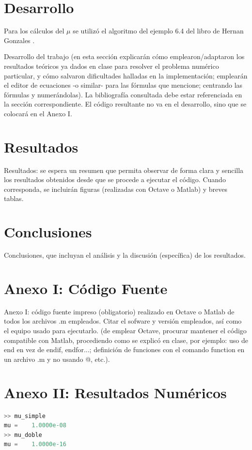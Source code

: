 \documentclass[11pt,a4paper]{article}
\begin{document}
\section{Desarrollo}
Para los cálculos del \(\mu\) se utilizó el algoritmo del ejemplo 6.4 del libro de Hernan Gonzales \cite{Gonzales}.
 
 Desarrollo del trabajo (en esta sección explicarán cómo emplearon/adaptaron los
resultados teóricos ya dados en clase para resolver el problema numérico particular, y cómo
salvaron dificultades halladas en la implementación; emplearán el editor de ecuaciones -o
similar- para las fórmulas que mencione; centrando las fórmulas y numerándolas). La
bibliografía consultada debe estar referenciada en la sección correspondiente. El código
resultante no va en el desarrollo, sino que se colocará en el Anexo I.

\section{Resultados}
 Resultados: se espera un resumen que permita observar de forma clara y sencilla los
resultados obtenidos desde que se procede a ejecutar el código. Cuando corresponda, se
incluirán figuras (realizadas con Octave o Matlab) y breves tablas.

\section{Conclusiones}
 Conclusiones, que incluyan el análisis y la discusión (específica) de los resultados.

\newpage
\appendix
\section{Anexo I: Código Fuente}




Anexo I: código fuente impreso (obligatorio) realizado en Octave o Matlab de todos los
archivos .m empleados. Citar el sofware y versión empleados, así como el equipo usado para
ejecutarlo. (de emplear Octave, procurar mantener el código compatible con Matlab,
procediendo como se explicó en clase, por ejemplo: uso de end en vez de endif, endfor...;
definición de funciones con el comando function en un archivo .m y no usando @, etc.).

\section{Anexo II: Resultados Numéricos}
\begin{lstlisting}[language=Octave]
>> mu_simple
mu =    1.0000e-08
>> mu_doble
mu =    1.0000e-16
\end{lstlisting}
\end{document}
